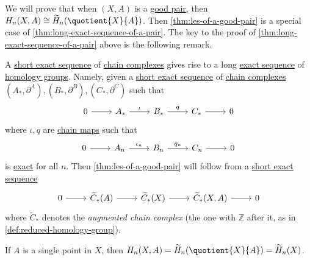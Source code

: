 We will prove that when \((X, A)\) is a \hyperref[def:good-pair]{good pair}, then \(H_n(X, A) \cong \widetilde{H}_n(\quotient{X}{A})\). Then \autoref{thm:les-of-a-good-pair} is a special case of \autoref{thm:long-exact-sequence-of-a-pair}. The key to the proof of \autoref{thm:long-exact-sequence-of-a-pair} above is the following remark.

\begin{remark}
	A \hyperref[def:short-exact-sequence]{short exact sequence} of \hyperref[def:chain-complex]{chain complexes} gives rise to a long \hyperref[def:exact-sequence]{exact sequence} of \hyperref[def:homology-group]{homology groups}. Namely, given a \hyperref[def:short-exact-sequence]{short exact sequence} of \hyperref[def:chain-complex]{chain complexes} \((A_\ast, \partial^A), (B_\ast, \partial^B), (C_\ast, \partial^C)\) such that
	\[
		\begin{tikzcd}
			0 & {A_\ast} & {B_\ast} & {C_\ast} & 0
			\arrow[from=1-1, to=1-2]
			\arrow["\iota", from=1-2, to=1-3]
			\arrow["q", from=1-3, to=1-4]
			\arrow[from=1-4, to=1-5]
		\end{tikzcd}
	\]
	where \(\iota , q\) are \hyperref[def:chain-map]{chain maps} such that
	\[
		\begin{tikzcd}
			0 & {A_n} & {B_n} & {C_n} & 0
			\arrow[from=1-1, to=1-2]
			\arrow["\iota_{n}", from=1-2, to=1-3]
			\arrow["q_{n}", from=1-3, to=1-4]
			\arrow[from=1-4, to=1-5]
		\end{tikzcd}
	\]
	is \hyperref[def:exact]{exact} for all \(n\). Then \autoref{thm:les-of-a-good-pair} will follow from a \hyperref[def:short-exact-sequence]{short exact sequence}
	\[
		\begin{tikzcd}
			0 & {\widetilde{C}_\ast(A)} & {\widetilde{C}_\ast(X)} & {\widetilde{C}_\ast(X, A)} & 0
			\arrow[from=1-1, to=1-2]
			\arrow[from=1-2, to=1-3]
			\arrow[from=1-3, to=1-4]
			\arrow[from=1-4, to=1-5]
		\end{tikzcd}
	\]
	where \(\widetilde{C}_\ast\) denotes the \emph{augmented chain complex} (the one with \(\mathbb{Z}\) after it, as in \autoref{def:reduced-homology-group}).
\end{remark}

\begin{exercise}
	If \(A\) is a single point in \(X\), then \(H_n(X, A) = \widetilde{H}_n(\quotient{X}{A}) = \widetilde{H}_n(X)\).
\end{exercise}